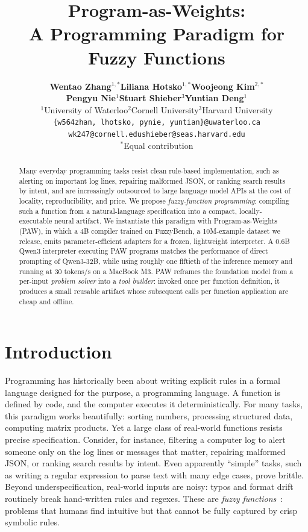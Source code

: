 \documentclass{article}
\title{Program-as-Weights:\\A Programming Paradigm for Fuzzy Functions}
\author{%
  \textbf{Wentao Zhang$^{1,*}$\quad Liliana Hotsko$^{1,*}$\quad Woojeong Kim$^{2,*}$} \\[3pt]
  \textbf{Pengyu Nie$^{1}$\quad Stuart Shieber$^{3}$\quad Yuntian Deng$^{1}$} \\[5pt]
  \normalfont $^{1}$University of Waterloo\qquad $^{2}$Cornell University\qquad $^{3}$Harvard University \\[4pt]
  \normalfont\small\texttt{\{w564zhan, lhotsko, pynie, yuntian\}@uwaterloo.ca} \\[1pt]
  \normalfont\small\texttt{wk247@cornell.edu}\qquad\texttt{shieber@seas.harvard.edu} \\[4pt]
  \normalfont $^{*}$Equal contribution%
}
\theoremstyle{plain}
\theoremstyle{definition}
\theoremstyle{remark}
\begin{document}
\maketitle


\begin{abstract}
Many everyday programming tasks resist clean rule-based implementation, such as alerting on important log lines, repairing malformed JSON, or ranking search results by intent, and are increasingly outsourced to large language model APIs at the cost of locality, reproducibility, and price. We propose \emph{fuzzy-function programming}: compiling such a function from a natural-language specification into a compact, locally-executable neural artifact. We instantiate this paradigm with Program-as-Weights (PAW), in which a 4B compiler trained on FuzzyBench, a 10M-example dataset we release, emits parameter-efficient adapters for a frozen, lightweight interpreter. A 0.6B Qwen3 interpreter executing PAW programs matches the performance of direct prompting of Qwen3-32B, while using roughly one fiftieth of the inference memory and running at 30 tokens/s on a MacBook M3. PAW reframes the foundation model from a per-input \emph{problem solver} into a \emph{tool builder}: invoked once per function definition, it produces a small reusable artifact whose subsequent calls per function application are cheap and offline.
\end{abstract}


\section{Introduction}
\label{sec:intro}

Programming has historically been about writing explicit rules in a formal language designed for the purpose, a programming language. A function is defined by code, and the computer executes it deterministically. For many tasks, this paradigm works beautifully: sorting numbers, processing structured data, computing matrix products. Yet a large class of real-world functions resists precise specification. Consider, for instance, filtering a computer log to alert someone only on the log lines or messages that matter, repairing malformed JSON, or ranking search results by intent. Even apparently ``simple'' tasks, such as writing a regular expression to parse text with many edge cases, prove brittle. Beyond underspecification, real-world inputs are noisy: typos and format drift routinely break hand-written rules and regexes. These are \emph{fuzzy functions}~\citep{10.5555/2594622.2594630}: problems that humans find intuitive but that cannot be fully captured by crisp symbolic rules.
\end{document}
